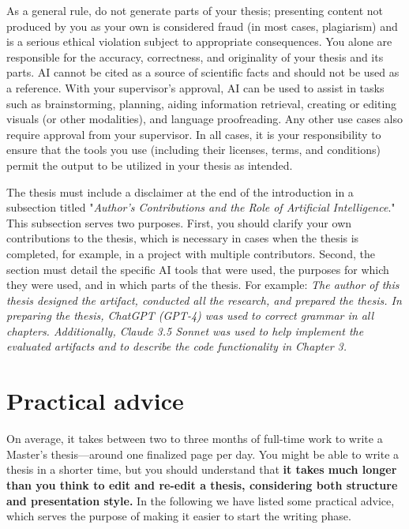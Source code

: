 As a general rule, do not generate parts of your thesis; presenting content not produced by you as your own is considered fraud (in most cases, plagiarism) and is a serious ethical violation subject to appropriate consequences. You alone are responsible for the accuracy, correctness, and originality of your thesis and its parts. AI cannot be cited as a source of scientific facts and should not be used as a reference. With your supervisor's approval, AI can be used to assist in tasks such as brainstorming, planning, aiding information retrieval, creating or editing visuals (or other modalities), and language proofreading. Any other use cases also require approval from your supervisor. In all cases, it is your responsibility to ensure that the tools you use (including their licenses, terms, and conditions) permit the output to be utilized in your thesis as intended.

The thesis must include a disclaimer at the end of the introduction in a subsection titled "\textit{Author's Contributions and the Role of Artificial Intelligence}." This subsection serves two purposes. First, you should clarify your own contributions to the thesis, which is necessary in cases when the thesis is completed, for example, in a project with multiple contributors. Second, the section must detail the specific AI tools that were used, the purposes for which they were used, and in which parts of the thesis. For example: \textit{The author of this thesis designed the artifact, conducted all the research, and prepared the thesis. In preparing the thesis, ChatGPT (GPT-4) was used to correct grammar in all chapters. Additionally, Claude 3.5 Sonnet was used to help implement the evaluated artifacts and to describe the code functionality in Chapter 3.}




\section{Practical advice}

On average, it takes between two to three months of full-time work to write a Master’s thesis---around one finalized page per day. You might be able to write a thesis in a shorter time, but you should understand that \textbf{it takes much longer than you think to edit and re-edit a thesis, considering both structure and presentation style.} In the following we have listed some practical advice, which serves the purpose of making it easier to start the writing phase.

